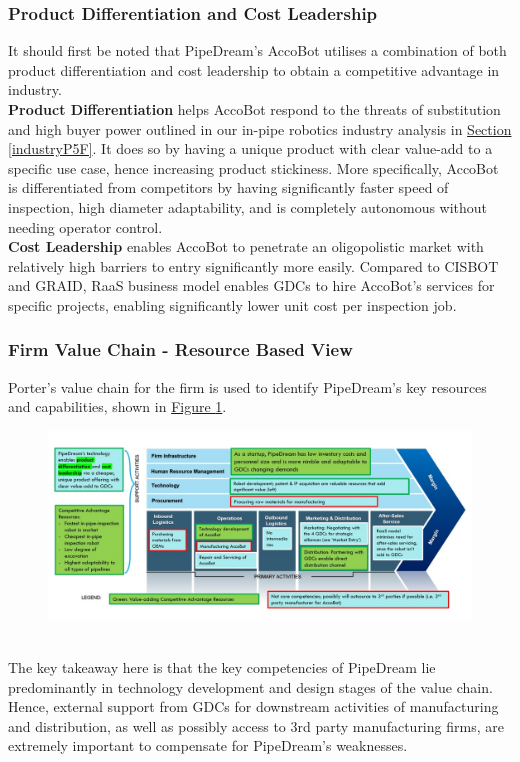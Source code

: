 \documentclass[11pt]{article}		%
\newcommand{\figref}[1]{\hyperref[#1]{Figure \ref*{#1}}}    %
\newcommand{\sectref}[1]{\hyperref[#1]{Section \ref*{#1}}}     %
\begin{document}
	\subsubsection{Product Differentiation and Cost Leadership}\label{strategy}
	
	It should first be noted that PipeDream's AccoBot utilises a combination of both product differentiation and cost leadership to obtain a competitive advantage in industry.
	\\ 
	\hspace*{3ex}\textbf{Product Differentiation} helps AccoBot respond to the threats of substitution and high buyer power outlined in our in-pipe robotics industry analysis in \sectref{industryP5F}. It does so by having a unique product with clear value-add to a specific use case, hence increasing product stickiness. More specifically, AccoBot is differentiated from competitors by having significantly faster speed of inspection, high diameter adaptability, and is completely autonomous without needing operator control.
	\\ 
	\hspace*{3ex}\textbf{Cost Leadership} enables AccoBot to penetrate an oligopolistic market with relatively high barriers to entry significantly more easily. Compared to CISBOT and GRAID, RaaS business model enables GDCs to hire AccoBot's services for specific projects, enabling significantly lower unit cost per inspection job. 
	
	\subsubsection[Firm Value Chain]{Firm Value Chain - Resource Based View}\label{valueChainanal}
	
        Porter's value chain for the firm is used to identify PipeDream's key resources and capabilities, shown in \figref{valueChain}. 
        \begin{figure}[h]
    		\centering
			\includegraphics[width=\textwidth]{valuechain.jpg}
			\label{valueChain}
        \end{figure}
        \\ 
	    \hspace*{3ex} The key takeaway here is that the key competencies of PipeDream lie predominantly in technology development and design stages of the value chain. Hence, external support from GDCs for downstream activities of manufacturing and distribution, as well as possibly access to 3rd party manufacturing firms, are extremely important to compensate for PipeDream's weaknesses. 
\end{document}
